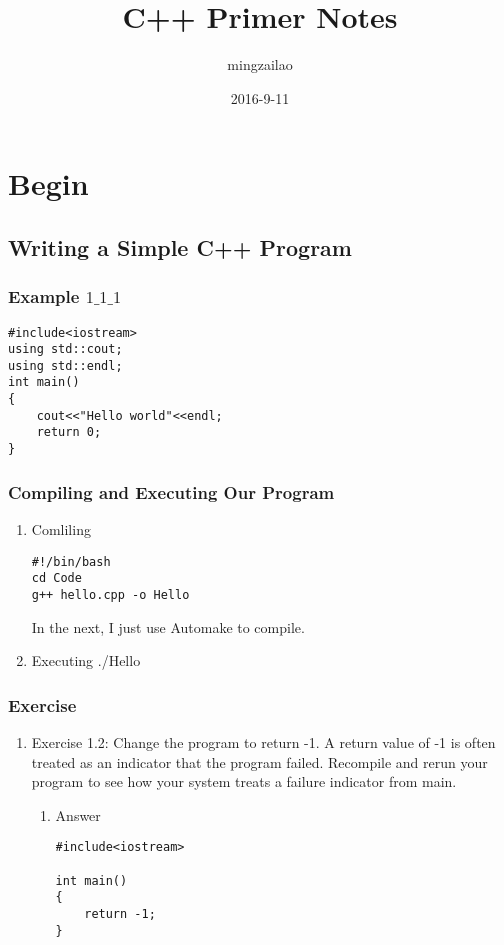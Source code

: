 \documentclass[11pt]{article}
\author{mingzailao}
\date{2016-9-11}
\title{C++ Primer Notes}
\begin{document}
\maketitle
\tableofcontents

\section{Begin}
\label{sec-1}
\subsection{Writing a Simple C++ Program}
\label{sec-1-1}
\subsubsection{Example $1\_1\_1$}
\label{sec-1-1-1}
\begin{verbatim}
#include<iostream>
using std::cout;
using std::endl;
int main()
{
    cout<<"Hello world"<<endl;
    return 0;
}
\end{verbatim}
\subsubsection{Compiling and Executing Our Program}
\label{sec-1-1-2}
\begin{enumerate}
\item Comliling
\label{sec-1-1-2-1}
\begin{verbatim}
#!/bin/bash
cd Code
g++ hello.cpp -o Hello
\end{verbatim}
In the next, I just use Automake to compile.

\item Executing
\label{sec-1-1-2-2}
./Hello
\end{enumerate}
\subsubsection{Exercise}
\label{sec-1-1-3}
\begin{enumerate}
\item Exercise 1.2: Change the program to return -1. A return value of -1 is often treated as an indicator that the program failed. Recompile and rerun your program to see how your system treats a failure indicator from main.
\label{sec-1-1-3-1}
\begin{enumerate}
\item Answer
\label{sec-1-1-3-1-1}
\begin{verbatim}
#include<iostream>

int main()
{
    return -1;
}
\end{verbatim}
\end{enumerate}
\end{enumerate}
\end{document}
